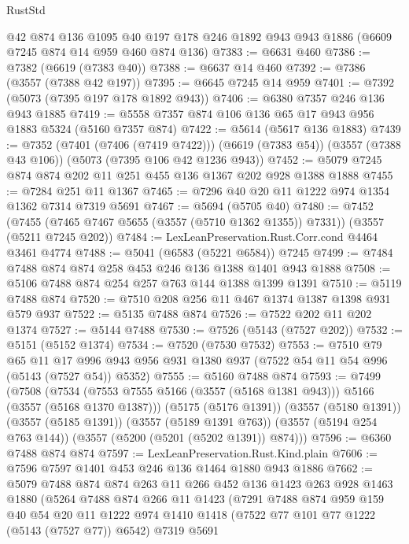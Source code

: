 \begin{lexlean}{RustStd}
\begin{coremodule}
    @42
    @874
    @136
    @1095
    @40
    @197
    @178
    @246
    @1892
    @943
    @943
    @1886
    (@6609 @7245 @874 @14 @959 @460 @874 @136)
@7383 := @6631 @460
@7386 := @7382 (@6619 (@7383 @40))
@7388 := @6637 @14 @460
@7392 := @7386 (@3557 (@7388 @42 @197))
@7395 := @6645 @7245 @14 @959
@7401 := @7392 (@5073 (@7395 @197 @178 @1892 @943))
@7406 := @6380 @7357 @246 @136 @943 @1885
@7419 := @5558 @7357 @874 @106 @136 @65 @17 @943 @956 @1883 @5324 (@5160 @7357 @874)
@7422 := @5614 (@5617 @136 @1883)
@7439 := @7352
    (@7401 (@7406 (@7419 @7422)))
    (@6619 (@7383 @54))
    (@3557 (@7388 @43 @106))
    (@5073 (@7395 @106 @42 @1236 @943))
@7452 := @5079 @7245 @874 @874 @202 @11 @251 @455 @136 @1367 @202 @928 @1388 @1888
@7455 := @7284 @251 @11 @1367
@7465 := @7296 @40 @20 @11 @1222 @974 @1354 @1362 @7314 @7319 @5691
@7467 := @5694 (@5705 @40)
@7480 := @7452
    (@7455 (@7465 @7467 @5655 (@3557 (@5710 @1362 @1355)) @7331))
    (@3557 (@5211 @7245 @202))
@7484 := LexLeanPreservation.Rust.Corr.cond @4464 @3461 @4774
@7488 := @5041 (@6583 (@5221 @6584)) @7245
@7499 := @7484 @7488 @874 @874 @258 @453 @246 @136 @1388 @1401 @943 @1888
@7508 := @5106 @7488 @874 @254 @257 @763 @144 @1388 @1399 @1391
@7510 := @5119 @7488 @874
@7520 := @7510 @208 @256 @11 @467 @1374 @1387 @1398 @931 @579 @937
@7522 := @5135 @7488 @874
@7526 := @7522 @202 @11 @202 @1374
@7527 := @5144 @7488
@7530 := @7526 (@5143 (@7527 @202))
@7532 := @5151 (@5152 @1374)
@7534 := @7520 (@7530 @7532)
@7553 := @7510
    @79
    @65
    @11
    @17
    @996
    @943
    @956
    @931
    @1380
    @937
    (@7522 @54 @11 @54 @996 (@5143 (@7527 @54)) @5352)
@7555 := @5160 @7488 @874
@7593 := @7499
    (@7508
      (@7534 (@7553 @7555 @5166 (@3557 (@5168 @1381 @943))) @5166 (@3557 (@5168 @1370 @1387)))
      (@5175 (@5176 @1391))
      (@3557 (@5180 @1391))
      (@3557 (@5185 @1391))
      (@3557 (@5189 @1391 @763))
      (@3557 (@5194 @254 @763 @144))
      (@3557 (@5200 (@5201 (@5202 @1391)) @874)))
@7596 := @6360 @7488 @874 @874
@7597 := LexLeanPreservation.Rust.Kind.plain
@7606 := @7596 @7597 @1401 @453 @246 @136 @1464 @1880 @943 @1886
@7662 := @5079
    @7488
    @874
    @874
    @263
    @11
    @266
    @452
    @136
    @1423
    @263
    @928
    @1463
    @1880
    (@5264
      @7488
      @874
      @266
      @11
      @1423
      (@7291
        @7488
        @874
        @959
        @159
        @40
        @54
        @20
        @11
        @1222
        @974
        @1410
        @1418
        (@7522 @77 @101 @77 @1222 (@5143 (@7527 @77)) @6542)
        @7319
        @5691

\end{coremodule}
\end{lexlean}

